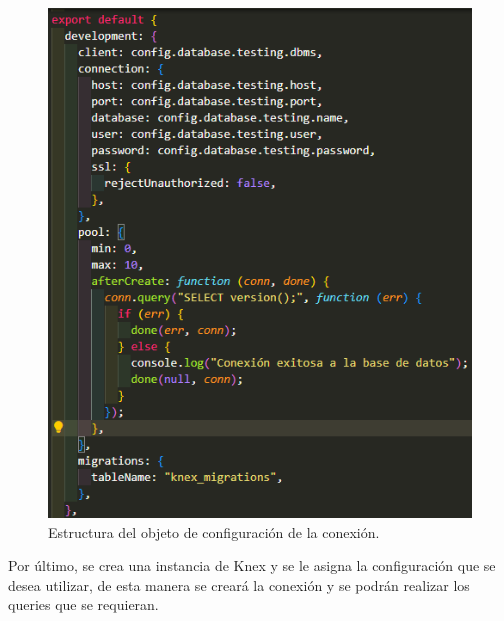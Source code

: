     \begin{figure}[H]
        \begin{center}
            \includegraphics[scale=0.6]{img/actividades/conexion/objeto-conexion.png}
            \caption{Estructura del objeto de configuración de la conexión.}
            \label{fig:estructura-objeto}
        \end{center}
    \end{figure}
Por último, se crea una instancia de Knex y se le asigna la configuración que se desea utilizar, de esta manera se creará la conexión y se podrán realizar los queries que se requieran.